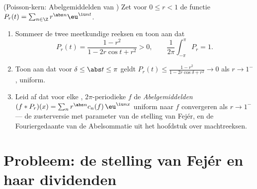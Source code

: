 \begin{exercise}[$\star\star\star$]\label{exo:b2:fourier:12}
(Poisson-kern: Abelgemiddelden van ) Zet voor $0 \leq
r < 1$ de functie $P_r(t) = \sum_{n\in\Z} r^{\abs n}\eu^{\iu nt}$.
\begin{enumerate}
  \item Sommeer de twee meetkundige reeksen en toon aan dat
        \[
        P_r(t) = \frac{1 - r^2}{1 - 2r\cos t + r^2} > 0,
        \qquad
        \frac{1}{2\pi}\int_{-\pi}^{\pi}P_r = 1 .
        \]
  \item Toon aan dat voor $\delta \leq \abs t \leq \pi$ geldt
        $P_r(t) \leq \frac{1 - r^2}{1 - 2r\cos\delta + r^2} \to 0$
        als $r \to 1^-$, uniform.
  \item Leid af dat voor elke , $2\pi$-periodieke $f$ de
        \emph{Abelgemiddelden} $(f * P_r)(x) = \sum_n r^{\abs
        n}c_n(f)\,\eu^{\iu nx}$ uniform naar $f$ convergeren als
        $r \to 1^-$ --- de zusterversie met  parameter van
        de stelling van Fejér, en de Fouriergedaante van de
        Abelsommatie uit het hoofdstuk over machtreeksen.
\end{enumerate}
\end{exercise}

\section{Probleem: de stelling van Fejér en haar dividenden}

